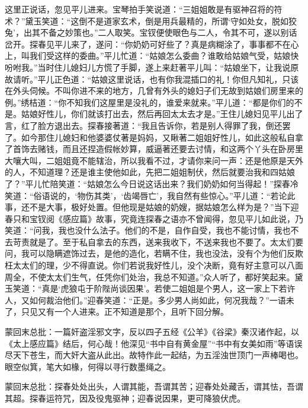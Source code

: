 \begin{parag}


    这里正说话，忽见平儿进来。宝琴拍手笑说道：“三姐姐敢是有驱神召将的符术？”黛玉笑道：“这倒不是道家玄术，倒是用兵最精的，所谓‘守如处女，脱如狡兔’，出其不备之妙策也。”二人取笑。宝钗便使眼色与二人，令其不可，遂以别话岔开。探春见平儿来了，遂问：“你奶奶可好些了？真是病糊涂了，事事都不在心上，叫我们受这样的委曲。”平儿忙道：“姑娘怎么委曲？谁敢给姑娘气受，姑娘快吩咐我。”当时住儿媳妇儿方慌了手脚，遂上来赶著平儿叫：“姑娘坐下，让我说原故请听。”平儿正色道：“姑娘这里说话，也有你我混插口的礼！你但凡知礼，只该在外头伺候。不叫你进不来的地方，几曾有外头的媳妇子们无故到姑娘们房里来的例。”绣桔道：“你不知我们这屋里是没礼的，谁爱来就来。”平儿道：“都是你们的不是。姑娘好性儿，你们就该打出去，然后再回太太去才是。”王住儿媳妇见平儿出了言，红了脸方退出去。探春接著道：“我且告诉你，若是别人得罪了我，倒还罢了。如今那住儿媳妇和他婆婆仗著是妈妈，又瞅著二姐姐好性儿，如此这般私自拿了首饰去赌钱，而且还捏造假帐妙算，威逼著还要去讨情，和这两个丫头在卧房里大嚷大叫，二姐姐竟不能辖治，所以我看不过，才请你来问一声：还是他原是天外的人，不知道理？还是谁主使他如此，先把二姐姐制伏，然后就要治我和四姑娘了？”平儿忙陪笑道：“姑娘怎么今日说这话出来？我们奶奶如何当得起！”探春冷笑道：“俗语说的，‘物伤其类’，‘齿竭唇亡’，我自然有些惊心。”平儿道：“若论此事，还不是大事，极好处置。但他现是姑娘的奶嫂，据姑娘怎么样为是？”当下迎春只和宝钗阅《感应篇》故事，究竟连探春之语亦不曾闻得，忽见平儿如此说，乃笑道：“问我，我也没什么法子。他们的不是，自作自受，我也不能讨情，我也不去苛责就是了。至于私自拿去的东西，送来我收下，不送来我也不要了。太太们要问，我可以隐瞒遮饰过去，是他的造化，若瞒不住，我也没法，没有个为他们反欺枉太太们的理，少不得直说。你们若说我好性儿，没个决断，竟有好主意可以八面周全，不使太太们生气，任凭你们处治，我总不知道。”众人听了，都好笑起来。黛玉笑道：“真是‘虎狼屯于阶陛尚谈因果’。若使二姐姐是个男人，这一家上下若许人，又如何裁治他们。”迎春笑道：“正是。多少男人尚如此，何况我哉？”一语未了，只见又有一个人进来。正不知道是那个，且听下回分解。
\end{parag}

\begin{parag}

    \begin{note}蒙回末总批：一篇奸盗淫邪文字，反以四子五经《公羊》《谷梁》秦汉诸作起，以《太上感应篇》结后，何心哉！他深见“书中自有黄金屋”“书中有女美如雨”等语误尽天下苍生，而大奸大盗从此出。故特作此一起结，为五淫浊世顶门一声棒喝也。眼空似箕，笔大如椽，何得以寻行数墨绳之。\end{note}
\end{parag}


\begin{parag}


    \begin{note}蒙回末总批：探春处处出头，人谓其能，吾谓其苦；迎春处处藏舌，谓其怯，吾谓其超。探春运符咒，因及役鬼驱神；迎春说因果，更可降狼伏虎。\end{note}
\end{parag}
